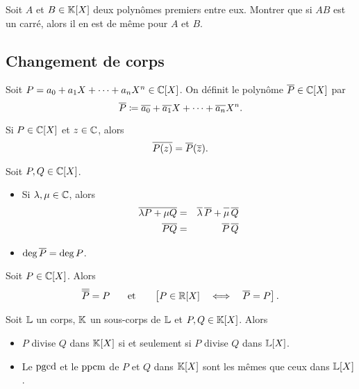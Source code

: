 \documentclass{magnolia}
\begin{document}
\begin{exoUnique}
\exo Soit $A$ et $B\in\polyK$ deux polynômes premiers entre eux. Montrer
  que si $AB$ est un carré, alors il en est de même pour $A$ et $B$.
\end{exoUnique}

\subsection{Changement de corps}

\begin{definition}
Soit $P=a_0+a_1 X+\cdots+a_n X^n\in\polyC$. On définit le polynôme
$\conj{P}\in\polyC$ par
\[\overline{P}\coloneqq \overline{a_0}+\overline{a_1}X+\cdots+\overline{a_n}X^n.\]
\end{definition}

\begin{remarqueUnique}
\remarque Si $P\in\polyC$ et $z\in\mathbb{C}$, alors
  \[\overline{P(z)}=\overline{P}(\overline{z}).\]
\end{remarqueUnique}

\begin{proposition}
Soit $P,Q\in\polyC$.
\begin{itemize}
\item  Si $\lambda,\mu\in\mathbb{C}$, alors
\begin{eqnarray*}
  \conj{\lambda P+\mu Q}&=&\conj{\lambda}\, \conj{P}+\conj{\rule{0pt}{6.75pt}\mu}\, \conj{Q}\\
  \conj{P Q}&=&\conj{P}\,\conj{Q}
  \end{eqnarray*}
\item $\deg\overline{P}=\deg P$.
\end{itemize}
\end{proposition}

\begin{proposition}
Soit $P\in\polyC$. Alors
\[\conj{\conj{P}}=P \quad\et\quad \cro{P\in\polyR \quad\ssi\quad \conj{P}=P}.\]
\end{proposition}

\begin{proposition}
Soit $\mathbb{L}$ un corps, $\mathbb{K}$ un sous-corps de $\mathbb{L}$ et $P,Q\in\polyK$.
Alors
\begin{itemize}
\item $P$ divise $Q$ dans $\polyK$ si et seulement si $P$ divise $Q$ dans
  $\polyL$.
\item Le $\operatorname{pgcd}$ et le $\operatorname{ppcm}$ de $P$ et $Q$ dans $\polyK$ sont les mêmes que ceux dans $\polyL$.
\end{itemize}
\end{proposition}
\end{document}
